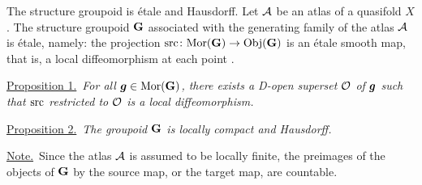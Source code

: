 \begin{Article}{The structure groupoid is étale and Hausdorff.}{}
  Let $\mathcal{A}$ be an atlas of a quasifold $X$.
  The structure groupoid ${\mathbf G}$ associated with the generating family of the atlas $\mathcal{A}$ is étale,
  namely: the projection $\mathrm{src} \colon {\operatorname{Mor}}({\mathbf G}) \to {\operatorname{Obj}}({\mathbf G})$ is an étale smooth map,
  that is,
  a local diffeomorphism at each point \cite[\textsection\,2.5]{PIZ13}.
  
  \uline{Proposition 1.}~{\itshape For all ${\boldsymbol g} \in {\operatorname{Mor}}({\mathbf G})$,
  there exists a D-open superset $\mathcal{O}$ of ${\boldsymbol g}$ such that $\mathrm{src}$ restricted to $\mathcal{O}$ is a local diffeomorphism.}
  
  \uline{Proposition 2.}~{\itshape The groupoid ${\mathbf G}$ is locally compact and Hausdorff.}
  
  \uline{Note.}~Since the atlas $\mathcal{A}$ is assumed to be locally finite,
  the preimages of the objects of ${\mathbf G}$ by the source map,
  or the target map,
  are countable.
\end{Article} %

